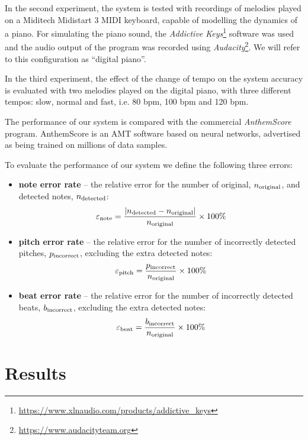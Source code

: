 \documentclass[conference]{IEEEtran}
\begin{document}
In the second experiment, the system is tested with recordings of melodies played on a Miditech Midistart 3 MIDI keyboard, capable of modelling the dynamics of a piano.
For simulating the piano sound, the \emph{Addictive Keys}\footnote{\url{https://www.xlnaudio.com/products/addictive_keys}} software was used and the audio output of the program was recorded using \emph{Audacity}\footnote{\url{https://www.audacityteam.org}}.
We will refer to this configuration as ``digital piano''.

In the third experiment, the effect of the change of tempo on the system accuracy is evaluated with two melodies played on the digital piano, with three different tempos: slow, normal and fast, i.e. 80 bpm, 100 bpm and 120 bpm.

The performance of our system is compared with the commercial \emph{AnthemScore} program.
AnthemScore is an AMT software based on neural networks, advertised as being trained on millions of data samples.

To evaluate the performance of our system we define the following three errors:
\begin{itemize}
	\item \textbf{note error rate} -- the relative error for the number of original, $n_{\rm{original}}$, and detected notes, $n_{\rm{detected}}$:
\begin{displaymath}
\varepsilon_{\rm{note}} = \frac{|n_{\rm{detected}} - n_{\rm{original}}|}{n_{\rm{original}}} \times 100 \%
\end{displaymath}
	\item \textbf{pitch error rate} -- the relative error for the number of incorrectly detected pitches, $p_{\rm{incorrect}}$, excluding the extra detected notes:
\begin{displaymath}
\varepsilon_{\rm{pitch}} = \frac{p_{\rm{incorrect}}}{n_{\rm{original}}} \times 100 \%
\end{displaymath}
	\item \textbf{beat error rate} -- the relative error for the number of incorrectly detected beats, $b_{\rm{incorrect}}$, excluding the extra detected notes:
\begin{displaymath}
\varepsilon_{\rm{beat}} = \frac{b_{\rm{incorrect}}}{n_{\rm{original}}} \times 100 \%
\end{displaymath}
\end{itemize}

\section{Results}
\end{document}
